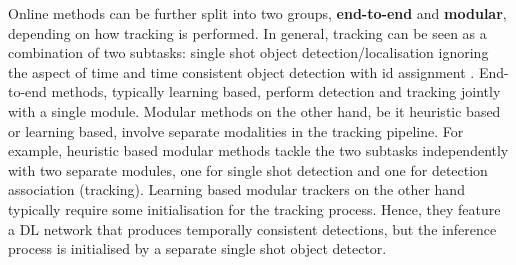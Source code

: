     

Online methods can be further split into two groups, \textbf{end-to-end} and \textbf{modular}, depending on how tracking is performed. In general, tracking can be seen as a combination of two subtasks: single shot object detection/localisation ignoring the aspect of time and time consistent object detection with id assignment \parencite{hota}. End-to-end methods, typically learning based, perform detection and tracking jointly with a single module. Modular methods on the other hand, be it heuristic based or learning based, involve separate modalities in the tracking pipeline. For example, heuristic based modular methods tackle the two subtasks independently with two separate modules, one for single shot detection and one for detection association (tracking). Learning based modular trackers on the other hand typically require some initialisation for the tracking process. Hence, they feature a DL network that produces temporally consistent detections, but the inference process is initialised by a separate single shot object detector.


